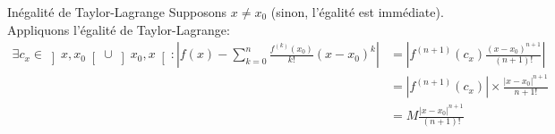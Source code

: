 \documentclass{article}
\begin{document}
\begin{question_kholle}{Inégalité de Taylor-Lagrange}
	Supposons $x\neq x_{0}$ (sinon, l’égalité est immédiate). Appliquons l’égalité de Taylor-Lagrange:
	\begin{align*}
		\exists c_{x}\in \left]x,x_{0}\right[\cup\left]x_{0}, x\right[: \left| f(x)-\sum_{k=0}^{n}\frac{f^{(k)}(x_{0})}{k!}(x-x_{0})^{k} \right| & = \left| f^{(n+1)}(c_{x})\frac{(x-x_{0})^{n+1}}{(n+1)!}\right|     \\
		                                                                                                                                         & =\left|f^{(n+1)}(c_{x})\right| \times \frac{|x-x_{0}|^{n+1}}{n+1!} \\
		                                                                                                                                         & =M \frac{|x-x_{0}|^{n+1}}{(n+1)!}
	\end{align*}
\end{question_kholle}
\end{document}
